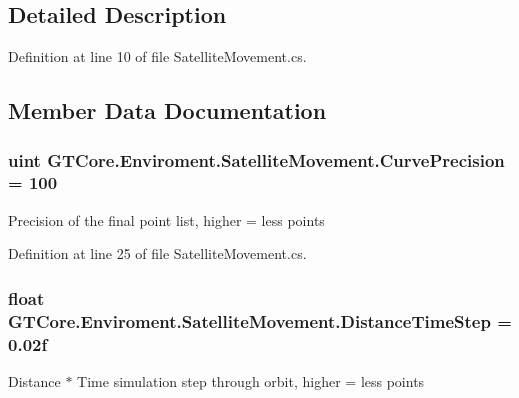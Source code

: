 \subsection{Detailed Description}


Definition at line 10 of file Satellite\+Movement.\+cs.



\subsection{Member Data Documentation}
\hypertarget{class_g_t_core_1_1_enviroment_1_1_satellite_movement_a4367ff0305eef42e5f23cdd3dcee1d6b}{}
\subsubsection[{Curve\+Precision}]{\setlength{\rightskip}{0pt plus 5cm}uint G\+T\+Core.\+Enviroment.\+Satellite\+Movement.\+Curve\+Precision = 100}\label{class_g_t_core_1_1_enviroment_1_1_satellite_movement_a4367ff0305eef42e5f23cdd3dcee1d6b}


Precision of the final point list, higher = less points 



Definition at line 25 of file Satellite\+Movement.\+cs.

\hypertarget{class_g_t_core_1_1_enviroment_1_1_satellite_movement_a2bcfe4e72d44e5c6850f151bea94ff0d}{}
\subsubsection[{Distance\+Time\+Step}]{\setlength{\rightskip}{0pt plus 5cm}float G\+T\+Core.\+Enviroment.\+Satellite\+Movement.\+Distance\+Time\+Step = 0.\+02f}\label{class_g_t_core_1_1_enviroment_1_1_satellite_movement_a2bcfe4e72d44e5c6850f151bea94ff0d}


Distance $\ast$ Time simulation step through orbit, higher = less points 




